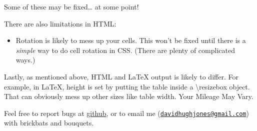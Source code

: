 \documentclass[]{article}
\providecommand{\tightlist}{%
  \setlength{\itemsep}{0pt}\setlength{\parskip}{0pt}}
\begin{document}
Some of these may be fixed\ldots{} at some point!

There are also limitations in HTML:

\begin{itemize}
\tightlist
\item
  Rotation is likely to mess up your cells. This won't be fixed until
  there is a \emph{simple} way to do cell rotation in CSS. (There are
  plenty of complicated ways.)
\end{itemize}

Lastly, as mentioned above, HTML and LaTeX output is likely to differ.
For example, in LaTeX, height is set by putting the table inside a
\textbackslash{}resizebox object. That can obviously mess up other sizes
like table width. Your Mileage May Vary.

Feel free to report bugs at
\href{https://github.com/hughjonesd/huxtable/issues}{github}, or to
email me
(\href{mailto:davidhughjones@gmail.com}{\nolinkurl{davidhughjones@gmail.com}})
with brickbats and bouquets.
\end{document}
